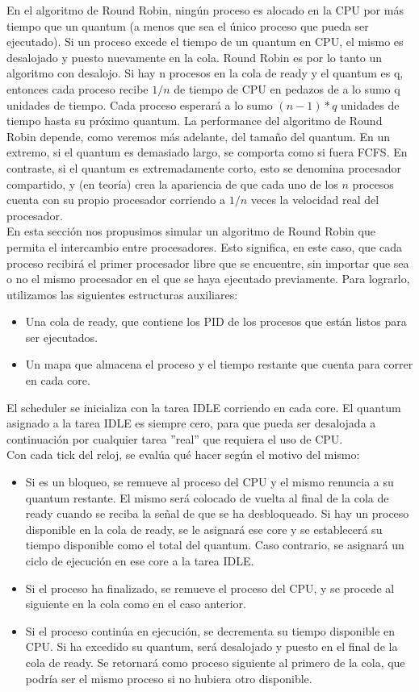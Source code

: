 En el algoritmo de Round Robin, ningún proceso es alocado en la CPU por más tiempo que un quantum (a menos que sea el único proceso que pueda ser ejecutado). Si un proceso excede el tiempo de un quantum en CPU, el mismo es desalojado y puesto nuevamente en la cola. Round Robin es por lo tanto un algoritmo con desalojo.
Si hay n procesos en la cola de ready y el quantum es q, entonces cada proceso recibe $1/n$ de tiempo de CPU en pedazos de a lo sumo q unidades de tiempo. Cada proceso esperará a lo sumo $(n-1)*q$ unidades de tiempo hasta su próximo quantum.   
La performance del algoritmo de Round Robin depende, como veremos más adelante, del tamaño del quantum. En un extremo, si el quantum es demasiado largo, se comporta como si fuera FCFS. En contraste, si el quantum es extremadamente corto, esto se denomina procesador compartido, y (en teoría) crea la apariencia de que cada uno de los $n$ procesos cuenta con su propio procesador corriendo a $1/n$ veces la velocidad real del procesador. \\

En esta sección nos propusimos simular un algoritmo de Round Robin que permita el intercambio entre procesadores. Esto significa, en este caso, que cada proceso recibirá el primer procesador libre que se encuentre, sin importar que sea o no el mismo procesador en el que se haya ejecutado previamente.
Para lograrlo, utilizamos las siguientes estructuras auxiliares: 
\begin{itemize}
	\item Una cola de ready, que contiene los PID de los procesos que están listos para ser ejecutados.
	\item Un mapa que almacena el proceso y el tiempo restante que cuenta para correr en cada core.
\end{itemize} 

El scheduler se inicializa con la tarea IDLE corriendo en cada core. El quantum asignado a la tarea IDLE es siempre cero, para que pueda ser desalojada a continuación por cualquier tarea ''real'' que requiera el uso de CPU. \\

Con cada tick del reloj, se evalúa qué hacer según el motivo del mismo: 
\begin{itemize}
	\item Si es un bloqueo, se remueve al proceso del CPU y el mismo renuncia a su quantum restante. El mismo será colocado de vuelta al final de la cola de ready cuando se reciba la señal de que se ha desbloqueado. Si hay un proceso disponible en la cola de ready, se le asignará ese core y se establecerá su tiempo disponible como el total del quantum. Caso contrario, se asignará un ciclo de ejecución en ese core a la tarea IDLE.
	\item Si el proceso ha finalizado, se remueve el proceso del CPU, y se procede al siguiente en la cola como  en el caso anterior.
	\item Si el proceso continúa en ejecución, se decrementa su tiempo disponible en CPU. Si ha excedido su quantum, será desalojado y puesto en el final de la cola de ready. Se retornará como proceso siguiente al primero de la cola, que podría ser el mismo proceso si no hubiera otro disponible.
\end{itemize}

